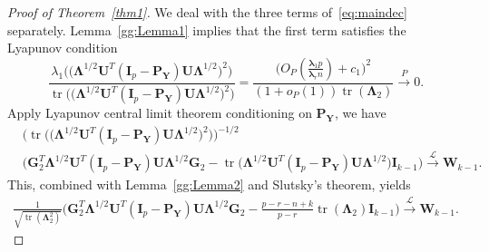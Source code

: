\documentclass[12pt]{article} %
\DeclareMathOperator{\mytr}{tr}
\newcommand{\bP}{\mathbf{P}}
\newcommand{\bY}{\mathbf{Y}}
\newcommand{\bG}{\mathbf{G}}
\newcommand{\bI}{\mathbf{I}}
\newcommand{\bU}{\mathbf{U}}
\newcommand{\bW}{\mathbf{W}}
\newcommand{\bfsym}[1]{\ensuremath{\boldsymbol{#1}}}
\def\blambda {\bfsym {\lambda}}
\def\bLambda {\bfsym {\Lambda}}
\theoremstyle{definition}
\begin{document}
\begin{proof}[\textrm{Proof of Theorem~\ref{thm1}}]

    We deal with the three terms of~\eqref{eq:maindec} separately.
    Lemma~\eqref{gg:Lemma1} implies that the first term satisfies the Lyapunov condition
$$
    \frac{\lambda_1\Big(\big(\bLambda^{1/2} \bU^T (\bI_p-\bP_{\bY})\bU \bLambda^{1/2}\big)^2\Big)}{\mytr \Big( \big(\bLambda^{1/2} \bU^T (\bI_p-\bP_{\bY})\bU \bLambda^{1/2}\big)^2\Big)}
=
\frac{
\big( O_P(\frac{\blambda_1 p}{\blambda_r n})+c_1\big)^2
}{
    (1+o_P(1))\mytr(\bLambda_2)
}
\xrightarrow{P} 0.
$$
Apply Lyapunov central limit theorem conditioning on $\bP_{\bY}$, we have
$$
\begin{aligned}
    &\Big(\mytr \Big(\big(\bLambda^{1/2} \bU^T (\bI_p-\bP_{\bY})\bU \bLambda^{1/2}\big)^2\Big) \Big)^{-1/2}\\
    &\big( \bG_2^T \bLambda^{1/2}\bU^T (\bI_p-\bP_{\bY})\bU\bLambda^{1/2}\bG_2
    -\mytr\big(\bLambda^{1/2} \bU^T (\bI_p-\bP_{\bY})\bU \bLambda^{1/2}\big)
     \bI_{k-1} \big)
\xrightarrow{\mathcal{L}} \bW_{k-1}.
\end{aligned}
$$
    This, combined with Lemma~\ref{gg:Lemma2} and Slutsky's theorem, yields
$$
\begin{aligned}
    \frac{1}{\sqrt{\mytr(\bLambda_2^2)}}
    \big( \bG_2^T \bLambda^{1/2} \bU^T (\bI_p-\bP_{\bY})\bU\bLambda^{1/2}\bG_2
    -\tfrac{p-r-n+k}{p-r}\mytr(\bLambda_2)\bI_{k-1} \big)
\xrightarrow{\mathcal{L}} \bW_{k-1}.
\end{aligned}
$$


\end{proof}
\end{document}
